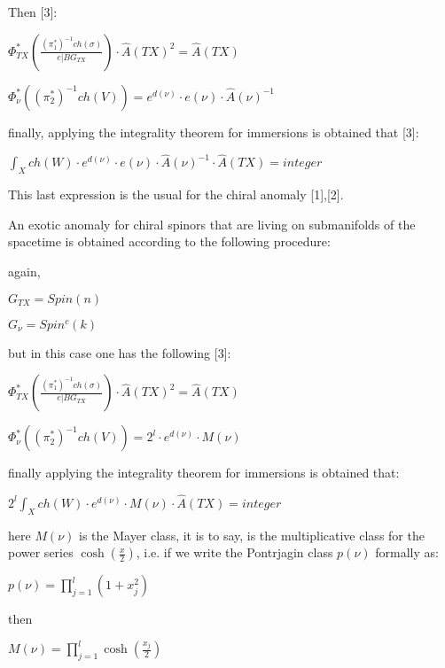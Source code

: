 \documentclass[a4paper,a4paper]{article}
\begin{document}
Then [3]:

\begin{center}
\setlength{\baselineskip}{40pt}
 {  $
\Phi_{TX}^{*}(\frac{(\pi_{1}^{*})^{-1}ch(\sigma)}{e|BG_{TX}})\cdot{\hat{A}(TX)^{2}}=\hat{A}(TX)$
}
\end{center}
\begin{center}
\setlength{\baselineskip}{40pt}
 {  $
\Phi_{\nu}^{*}((\pi_{2}^{*})^{-1}ch(V))=e^{d(\nu)}\cdot{e(\nu)}\cdot{\hat{A}(\nu)^{-1}}$
}
\end{center}
finally, applying the integrality theorem for immersions is obtained that [3]:
\begin{center}
\setlength{\baselineskip}{40pt}
 {  $
\int_{X}ch(W)\cdot{e^{d(\nu)}\cdot{e(\nu)}\cdot{\hat{A}(\nu)^{-1}}}\cdot{\hat{A}(TX)}=integer$
}
\end{center}

This last expression is the usual for the chiral anomaly [1],[2].

An exotic anomaly for chiral spinors that are living on submanifolds of the spacetime
is obtained according to the following procedure:

again,
\begin{center}
\setlength{\baselineskip}{40pt}
 {  $
G_{TX}=Spin(n)$ }
\end{center}
\begin{center}
\setlength{\baselineskip}{40pt}
 {  $
G_{\nu}=Spin^{c}(k)$ }
\end{center}

but in this case one has the following [3]:
\begin{center}
\setlength{\baselineskip}{40pt}
 {  $
\Phi_{TX}^{*}(\frac{(\pi_{1}^{*})^{-1}ch(\sigma)}{e|BG_{TX}})\cdot{\hat{A}(TX)^{2}}=\hat{A}(TX)$
}
\end{center}
\begin{center}
\setlength{\baselineskip}{40pt}
 {  $
\Phi_{\nu}^{*}((\pi_{2}^{*})^{-1}ch(V))=2^{l}\cdot{e^{d(\nu)}}\cdot{M(\nu)}$ }
\end{center}
finally applying the integrality theorem for immersions is obtained that:
\begin{center}
\setlength{\baselineskip}{40pt}
 {  $
2^{l}\int_{X}ch(W)\cdot{e^{d(\nu)}}\cdot{M(\nu)}\cdot{\hat{A}(TX)}=integer$ }
\end{center}

here $M(\nu)$ is the Mayer class, it is to say, is the multiplicative class for the
power series $\cosh(\frac{x}{2})$, i.e. if we write the Pontrjagin class $p(\nu)$
formally as:
\begin{center}
\setlength{\baselineskip}{40pt}
 {  $
p(\nu)=\prod_{j=1}^{l}(1+x_{j}^{2})$ }
\end{center}
then
\begin{center}
\setlength{\baselineskip}{40pt}
 {  $
M(\nu)=\prod_{j=1}^{l}\cosh(\frac{x_{j}}{2})$ }
\end{center}
\end{document}

